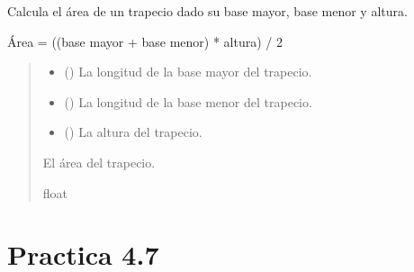 \documentclass[letterpaper,10pt,spanish]{sphinxmanual}
\begin{document}
\begin{fulllineitems}
\label{\detokenize{pr4:pr4.6.calcular_area_trapecio}}
\pysigstartsignatures
{}
\pysigstopsignatures
\sphinxAtStartPar
Calcula el área de un trapecio dado su base mayor, base menor y altura.
\begin{description}
\sphinxAtStartPar
Área = ((base mayor + base menor) * altura) / 2

\end{description}
\begin{quote}\begin{description}
\begin{itemize}
\item {} 
\sphinxAtStartPar
{} () \textendash{} La longitud de la base mayor del trapecio.

\item {} 
\sphinxAtStartPar
{} () \textendash{} La longitud de la base menor del trapecio.

\item {} 
\sphinxAtStartPar
{} () \textendash{} La altura del trapecio.

\end{itemize}

\sphinxAtStartPar
El área del trapecio.

\sphinxAtStartPar
float

\end{description}\end{quote}

\end{fulllineitems}



\section{Practica 4.7}
\label{\detokenize{pr4:module-pr4.7}}\label{\detokenize{pr4:practica-4-7}}
\end{document}
